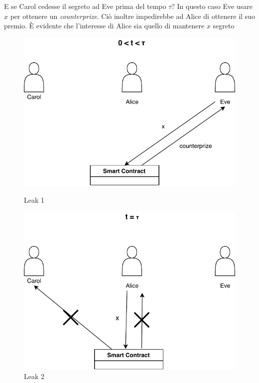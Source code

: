 E se Carol cedesse il segreto ad Eve prima del tempo $ \tau $?
In questo caso Eve usare $ x $ per ottenere un \textit{counterprize}. 
Ciò inoltre impedirebbe ad Alice di ottenere il suo premio. 
È evidente che l'interesse di Alice sia quello di mantenere $ x $ segreto
\begin{figure}[H]
	\begin{minipage}{0.5\textwidth}
        \centering
        \includegraphics[width=.9\linewidth]{images/chap_protocollo/leak-1.pdf}
        \caption{Leak 1}
      \end{minipage}\hfill
      \begin{minipage}{0.5\textwidth}
        \centering
        \includegraphics[width=.9\linewidth]{images/chap_protocollo/leak-2.pdf}
        \caption{Leak 2}
      \end{minipage}
\end{figure}


